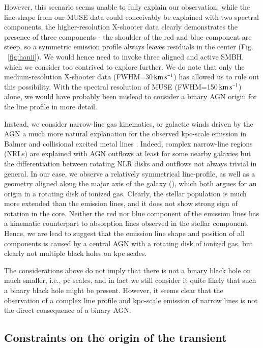\documentclass[traditabstract]{aa}
\newcommand{\kms}{$\rm{km\,s^{-1}}$}
\begin{document}
However, this scenario seems unable to fully explain our observation: while the line-shape from our MUSE data could conceivably be explained with two spectral components, the higher-resolution X-shooter data clearly demonstrates the presence of three components - the shoulder of the red and blue component are steep, so a symmetric emission profile always leaves residuals in the center (Fig. ~\ref{fig:hanii}). We would hence need to invoke three aligned and active SMBH, which we consider too contrived to explore further. We do note that only the medium-resolution X-shooter data (FWHM=30\,\kms) has allowed us to rule out this possibility. With the spectral resolution of MUSE (FWHM=150\,\kms) alone, we would have probably been mislead to consider a binary AGN origin for the line profile in more detail. 

Instead, we consider narrow-line gas kinematics, or galactic winds driven by the AGN a much more natural explanation for the observed kpc-scale emission in Balmer and collisional excited metal lines \citep[e.g.,][]{2011ApJ...735...48S}. Indeed, complex narrow-line regions (NRLs) are explained with AGN outflows at least for some nearby galaxies \citep[e.g.,][]{2011ApJ...727...71F} but the differentiation between rotating NLR disks and outflows not always trivial \citep{2011ApJ...735...48S, 2015ApJ...813..103M} in general. In our case, we observe a relatively symmetrical line-profile, as well as a geometry aligned along the major axis of the galaxy (), which both argues for an origin in a rotating disk of ionized gas. Clearly, the stellar population is much more extended than the emission lines, and it does not show strong sign of rotation in the core. Neither the red nor blue component of the emission lines has a kinematic counterpart to absorption lines observed in the stellar component. Hence, we are lead to suggest  that the emission line shape and position of all components is caused by a central AGN with a rotating disk of ionized gas, but clearly not multiple black holes on kpc scales.

The considerations above do not imply that there is not a binary black hole on much smaller, i.e., pc scales, and in fact we still consider it quite likely that such a binary black hole might be present. However, it seems clear that the observation of a complex line profile and kpc-scale emission of narrow lines is not the direct consequence of a binary AGN.

\subsection{Constraints on the origin of the transient}
\end{document}
